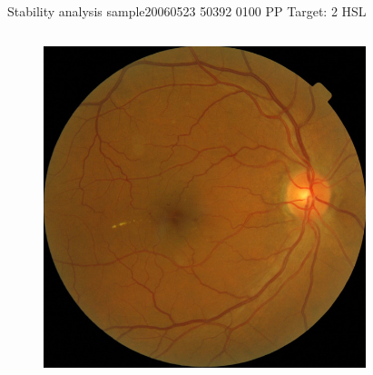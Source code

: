 \documentclass{beamer}
\begin{document}
\begin{frame}{Stability analysis sample}{20060523 50392 0100 PP Target: 2 HSL}
\begin{columns}
	\begin{column}{0.3\textwidth}
		\begin{figure}[p]
			\centering
			\includegraphics[width=\textwidth]{chapter_stability/20060523_50392_0100_PP/20060523_50392_0100_PP.jpeg}
		\end{figure}	
	\end{column}
	\begin{column}{0.45\textwidth}  %
		\begin{figure}[p]
			\centering

\end{figure}
\end{column}
\end{columns}
\end{frame}
\end{document}
